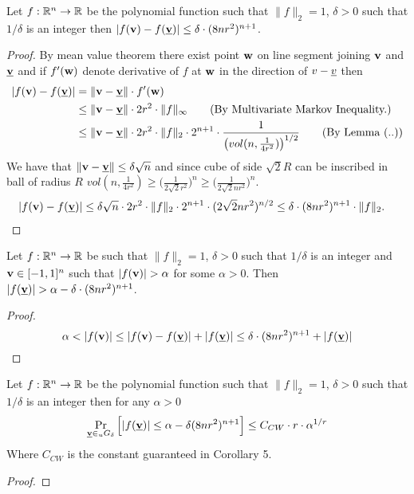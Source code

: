{\begin{lemma}
Let $f:\mathbb{R}^n \to \mathbb{R}$ be the polynomial function such that $\|f\|_2=1$, $\delta>0$ such that $1/\delta$ is an integer then $|f(\textbf v)-f(\underline{\textbf{v}})|\le \delta \cdot (8nr^2)^{n+1}$.
\end{lemma}
\begin{proof}
By mean value theorem there exist point $\textbf{w}$ on line segment joining $\textbf v$ and $\underline{\textbf v}$ and if $f'(\textbf w)$ denote derivative of $f$ at $\textbf w$ in the direction of $v-\underline v$ then
\begin{align*}
|f(\textbf v) - f(\textbf{\underline v})|&=\|\textbf v - \textbf{\underline v}\|\cdot f'(\textbf w) \\
&\le \|\textbf v-\textbf{\underline v}\|\cdot 2r^2 \cdot \|f\|_\infty\tag{By Multivariate Markov Inequality.}\\
&\le \|\textbf v- \textbf{\underline v}\| \cdot 2r^2 \cdot \|f\|_2 \cdot 2^{n+1}\cdot \frac{1}{\big(vol(n,\frac{1}{4r^2})\big)^{1/2}}\tag{By Lemma (..)}
\end{align*}
We have that $\|\textbf v - \textbf{\underline v}\| \le \delta\sqrt{n}$ and since cube of side $\sqrt{2}R$ can be inscribed in ball of radius $R$ $vol(n,\frac{1}{4r^2}) \ge \Big(\frac{1}{2\sqrt 2 r^2}\Big)^n\ge\Big(\frac{1}{2\sqrt 2 nr^2}\Big)^n$.
\begin{align*}
|f(\textbf v)-f(\textbf{\underline v})|&\le \delta\sqrt{n}\cdot2r^2 \cdot \|f\|_2 \cdot 2^{n+1}\cdot (2\sqrt{2}nr^2)^{n/2}\le \delta\cdot(8nr^2)^{n+1}\cdot\|f\|_2.
\end{align*}
\end{proof}
\begin{corollary}
Let $f:\mathbb{R}^n\to\mathbb{R}$ be such that $\|f\|_2=1$, $\delta>0$ such that $1/\delta$ is an integer and $\textbf v \in [-1,1]^n$ such that $|f(\textbf v)| > \alpha$ for some $\alpha>0$. Then $|f(\textbf{\underline v})| > \alpha - \delta\cdot(8nr^2)^{n+1}$.
\end{corollary}
\begin{proof}
$$
\alpha < |f(\textbf v)| \le |f(\textbf v)-f(\textbf{\underline v})|+|f(\textbf{\underline v})|\le\delta\cdot(8nr^2)^{n+1} + |f(\textbf{\underline v})|
$$
\end{proof}
\begin{theorem}
Let $f:\mathbb{R}^n \to \mathbb{R}$ be the polynomial function such that $\|f\|_2=1$, $\delta>0$ such that $1/\delta$ is an integer then for any $\alpha>0$ 
$$
\Pr_{\textbf{\underline v} \in_{u} G_{\delta}}\Big[|f(\textbf{\underline v})| \le \alpha-\delta(8nr^2)^{n+1}\Big] \le C_{CW}\cdot r \cdot \alpha^{1/r}
$$
Where $C_{CW}$ is the constant guaranteed in Corollary 5. 
\end{theorem}
\begin{proof}

\end{proof}}
